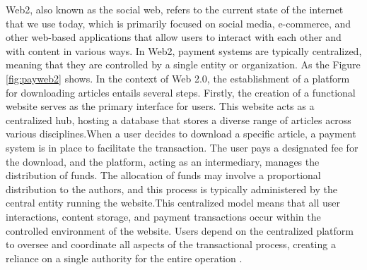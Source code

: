 \documentclass[lettersize,journal]{IEEEtran}
\begin{document}
Web2, also known as the social web, refers to the current state of the internet that we use today, which is primarily focused on social media, e-commerce, and other web-based applications that allow users to interact with each other and with content in various ways. In Web2, payment systems are typically centralized, meaning that they are controlled by a single entity or organization. 
As the Figure \ref{fig:payweb2} shows. In the context of Web 2.0, the establishment of a platform for downloading articles entails several steps. Firstly, the creation of a functional website serves as the primary interface for users. This website acts as a centralized hub, hosting a database that stores a diverse range of articles across various disciplines.When a user decides to download a specific article, a payment system is in place to facilitate the transaction. The user pays a designated fee for the download, and the platform, acting as an intermediary, manages the distribution of funds. The allocation of funds may involve a proportional distribution to the authors, and this process is typically administered by the central entity running the website.This centralized model means that all user interactions, content storage, and payment transactions occur within the controlled environment of the website. Users depend on the centralized platform to oversee and coordinate all aspects of the transactional process, creating a reliance on a single authority for the entire operation \cite{yu2002electronic}.
\end{document}
